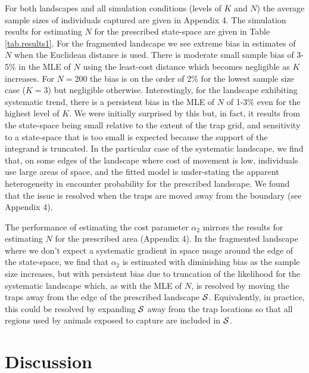 \documentclass[12pt]{article}
\begin{document}
\begin{spacing}{1.8}
For both landscapes and all simulation conditions (levels of $K$ and
$N$) the average sample sizes of individuals captured are given in
Appendix 4.  The simulation results for estimating $N$
for the prescribed state-space are given in Table \ref{tab.results1}.
For the fragmented %
landscape we see extreme
bias in estimates of $N$ when the Euclidean distance is used. There is
moderate small sample bias of 3-5\% in the MLE of $N$ using the
least-cost distance which becomes negligible as $K$ increases. For
$N=200$ the bias is on the order of 2\% for the lowest sample size
case ($K=3$) but negligible otherwise.  Interestingly, for the
landscape exhibiting systematic trend, there is a persistent bias
in the MLE of $N$ of 1-3\% even for the highest level of $K$. We were
initially surprised by this but, in fact, it results from
the state-space being small relative to the extent of the trap grid, and
sensitivity to a state-space that is too small is expected because the
support of the integrand is truncated. In the particular case of the
systematic landscape, we find that, on some edges of the landscape
where cost of movement is low, individuals use large areas of space,
and the fitted model is under-stating the apparent
heterogeneity in encounter probability for the prescribed landscape.  We
found that the issue is resolved when the traps are moved away from
the boundary (see Appendix 4).

The performance of estimating the cost parameter $\alpha_{2}$ mirrors
the results for estimating $N$ for the prescribed area
(Appendix 4). In the fragmented %
landscape where we don't expect a systematic gradient in space
usage around the edge of the state-space, we find
that $\alpha_{2}$ is estimated with
diminishing bias as the sample size increases, but with persistent
bias due to truncation of the likelihood for the systematic
landscape which, as with the MLE of $N$, is resolved by moving the
traps away from the edge of the prescribed landscape ${\cal S}$. Equivalently, in practice,
this could be resolved by expanding ${\cal S}$ away from the trap
locations so that all regions used by animals exposed to capture are
included in ${\cal S}$.



\section{Discussion}


\end{spacing}
\end{document}
